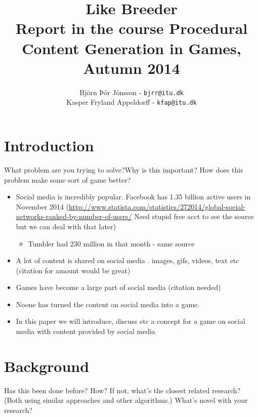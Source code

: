 \documentclass[]{article}
\title{Like Breeder\\ \small Report in the course Procedural Content Generation in Games, Autumn 2014}
\author{Björn Þór Jónsson - \texttt{bjrr@itu.dk}\\Kasper Fryland Appeldorff - \texttt{kfap@itu.dk}}
\begin{document}

\maketitle
\listoftodos %
\newpage
\begin{abstract}
\end{abstract}

\section{Introduction}
\label{sec:Introduction}
\begin{framed}
What problem are you trying to solve?Why is this important? How does this problem make some sort of game better?
\end{framed}
\begin{itemize}
\item Social media is incredibly popular. Facebook has 1.35 billion active users in November 2014 (\url{http://www.statista.com/statistics/272014/global-social-networks-ranked-by-number-of-users/} Need stupid free acct to see the source but we can deal with that later)
	\begin{itemize}
	\item Tumbler had 230 million in that month - same source
	\end{itemize}
\item A lot of content is shared on social media . images, gifs, videos, text etc (citation for amount would be great)
\item Games have become a large part of social media (citation needed)
\item Noone has turned the content on social media into a game.
\item In this paper we will introduce, discuss etc a concept for a game on social media with content provided by social media
\end{itemize}

\section{Background}
\label{sec:Background}

\begin{framed}
Has this been done before? How? If not, what’s the closest related research? (Both using similar approaches and other algorithms.) What’s novel with your research?
\end{framed}
\end{document}
